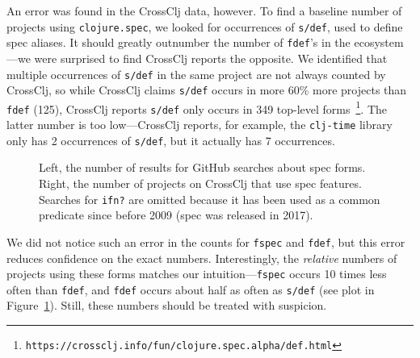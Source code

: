 An error was found in the CrossClj data, however.
To find a baseline number of projects using \texttt{clojure.spec}, we looked for occurrences of
\texttt{s/def}, used to define spec
aliases. It should greatly outnumber the number of \texttt{fdef}'s in the ecosystem---we were
surprised to find CrossClj reports the opposite.
We identified that multiple occurrences of \texttt{s/def} in the same project are not always counted by CrossClj,
so while CrossClj claims \texttt{s/def} occurs in more 60\% more projects than \texttt{fdef} (125), 
CrossClj reports \texttt{s/def} only occurs in 349 top-level 
forms~\footnote{\texttt{https://crossclj.info/fun/clojure.spec.alpha/def.html}}.
The latter number is too low---CrossClj reports, for example, the \texttt{clj-time}
library only has 2 occurrences of \texttt{s/def}, but it actually has 7 occurrences.

\begin{figure}
\caption{Left, the number of results for GitHub searches about spec forms.
Right, the number of projects on CrossClj that use spec features.
  Searches for \texttt{ifn?} are omitted because
  it has been used as a common predicate since before 2009 (spec was released in 2017).
  }
  \label{frequencybargraphs}
\end{figure}

We did not notice such an error in the counts for \texttt{fspec} and \texttt{fdef}, but
this error reduces confidence on the exact numbers. Interestingly, the \emph{relative}
numbers of projects using these forms matches our intuition---\texttt{fspec} occurs
10 times less often than \texttt{fdef}, and \texttt{fdef} occurs about half as often as \texttt{s/def}
(see plot in Figure~\ref{frequencybargraphs}).
Still, these numbers should be treated with suspicion.

